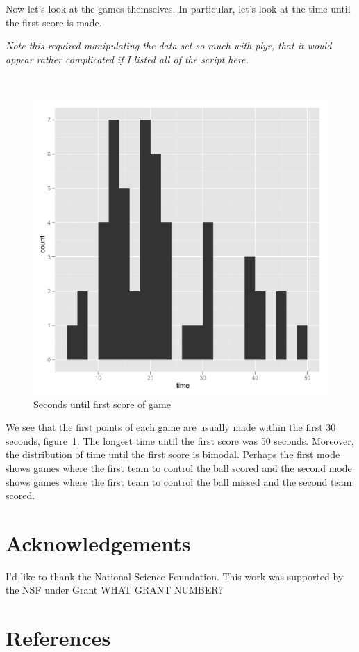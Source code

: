 \documentclass[article]{jss}
\begin{document}
Now let's look at the games themselves. In particular, let's look at the time until the first score is made. 

\emph{Note this required manipulating the data set so much with plyr, that it would appear rather complicated if I listed all of the script here.}


\\

\begin{figure}[htpb]
  \centering
  \includegraphics[width=.5\textwidth]{seconds-til-first-score.png}        
  \caption{Seconds until first score of game}
  \label{fig:first-score}
\end{figure}

We see that the first points of each game are usually made within the first 30 seconds, figure~\ref{fig:first-score}. The longest time until the first score was 50 seconds. Moreover, the distribution of time until the first score is bimodal. Perhaps the first mode shows games where the first team to control the ball scored and the second mode shows games where the first team to control the ball missed and the second team scored.



\section*{Acknowledgements}
I'd like to thank the National Science Foundation. This work was supported by the NSF under Grant WHAT GRANT NUMBER? 

\section*{References}
\end{document}
